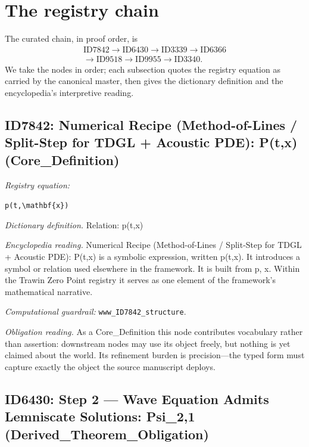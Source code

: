 \documentclass[11pt]{article}
\theoremstyle{remark}
\begin{document}
\section{The registry chain}
\label{sec:chain}

The curated chain, in proof order, is
\begin{equation*}
\begin{gathered}
\text{ID7842} \to \text{ID6430} \to \text{ID3339} \to \text{ID6366} \\
\to \text{ID9518} \to \text{ID9955} \to \text{ID3340}.
\end{gathered}
\end{equation*}
We take the nodes in order; each subsection quotes the registry equation as carried by the canonical master, then gives the dictionary definition and the encyclopedia's interpretive reading.

\subsection{ID7842: Numerical Recipe (Method-of-Lines / Split-Step for TDGL + Acoustic PDE): P(t,x) (Core\_Definition)}

\noindent\textit{Registry equation:}\par
{\small\texttt{p(t,\textbackslash{}mathbf\{x\})}}\par\medskip
\noindent\textit{Dictionary definition.} Relation: p(t,x)\par\medskip
\noindent\textit{Encyclopedia reading.} Numerical Recipe (Method-of-Lines / Split-Step for TDGL + Acoustic PDE): P(t,x) is a symbolic expression, written p(t,x). It introduces a symbol or relation used elsewhere in the framework. It is built from p, x. Within the Trawin Zero Point registry it serves as one element of the framework's mathematical narrative.
\par\medskip\noindent\textit{Computational guardrail:} \texttt{www\_ID7842\_structure}.
\par\medskip\noindent\textit{Obligation reading.} As a Core\_Definition this node contributes vocabulary rather than assertion: downstream nodes may use its object freely, but nothing is yet claimed about the world. Its refinement burden is precision---the typed form must capture exactly the object the source manuscript deploys.

\subsection{ID6430: Step 2 --- Wave Equation Admits Lemniscate Solutions: Psi\_2,1 (Derived\_Theorem\_Obligation)}
\end{document}
